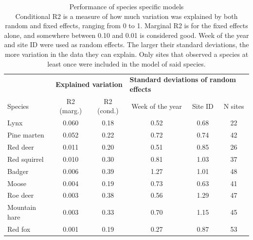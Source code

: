 \begin{table}[h]
	\centering
	\caption[Model performance]%
	{Performance of species specific models \footnotesize \\
	Conditional R2 is a measure of how much variation was explained by both random and fixed effects, ranging from 0 to 1. Marginal R2 is for the fixed effects alone, and somewhere between 0.10 and 0.01 is considered good. Week of the year and site ID were used as random effects. The larger their standard deviations, the more variation in the data they can explain. Only sites that observed a species at least once were included in the model of said species.}\label{r2}
\begin{tabular}{lccccc}
	\toprule
	&\multicolumn{2}{c}{\bfseries Explained variation} & \multicolumn{3}{l}{\bfseries Standard deviations of random effects }	\\
Species & R2 (marg.) & R2 (cond.) & Week of the year & Site ID & N sites \\
	\midrule
    Lynx        & 0.060 & 0.18 & 0.52 & 0.68 & 22 \\  %
    Pine marten & 0.052 & 0.22 & 0.72 & 0.74 & 42 \\  %
    Red deer    & 0.011 & 0.20 & 0.51 & 0.85 & 26 \\  %
 Red squirrel   & 0.010 & 0.30 & 0.81 & 1.03 & 37 \\  %
    Badger      & 0.006 & 0.39 & 1.27 & 1.01 & 48 \\  %
    Moose       & 0.004 & 0.19 & 0.73 & 0.63 & 41 \\  %
    Roe deer    & 0.003 & 0.38 & 0.56 & 1.29 & 47 \\  %
 Mountain hare  & 0.003 & 0.33 & 0.70 & 1.15 & 45 \\  %
    Red fox	    & 0.001 & 0.19 & 0.27 & 0.87 & 53 \\  %
    
    
 \bottomrule
\end{tabular}
\end{table}


\clearpage

